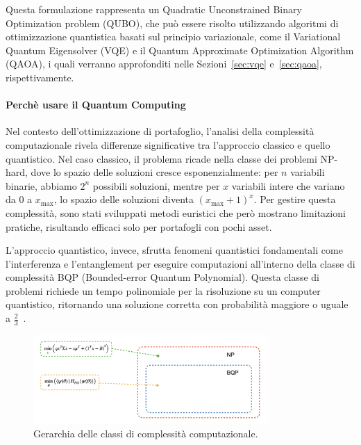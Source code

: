 Questa formulazione rappresenta un Quadratic Unconstrained Binary Optimization 
problem (QUBO), che può essere risolto utilizzando algoritmi di ottimizzazione 
quantistica basati sul principio variazionale, come il Variational Quantum Eigensolver 
(VQE) e il Quantum Approximate Optimization Algorithm (QAOA), i quali verranno
approfonditi nelle Sezioni~\ref{sec:vqe} e~\ref{sec:qaoa}, rispettivamente.


\paragraph{Perchè usare il Quantum Computing}
Nel contesto dell'ottimizzazione di portafoglio, l'analisi della complessità 
computazionale rivela differenze significative tra l'approccio classico e quello 
quantistico. Nel caso classico, il problema ricade nella classe dei problemi NP-hard, 
dove lo spazio delle soluzioni cresce esponenzialmente: per $n$ variabili binarie, 
abbiamo $2^n$ possibili soluzioni, mentre per $x$ variabili intere che variano da 
0 a $x_{\max}$, lo spazio delle soluzioni diventa $(x_{\max}+1)^x$. 
Per gestire questa complessità, sono stati sviluppati metodi euristici che però mostrano 
limitazioni pratiche, risultando efficaci solo per portafogli con pochi asset.

L'approccio quantistico, invece, sfrutta fenomeni quantistici fondamentali 
come l'interferenza e l'entanglement per eseguire computazioni all'interno della 
classe di complessità BQP (Bounded-error Quantum Polynomial). 
Questa classe di problemi richiede un tempo polinomiale per la risoluzione su un 
computer quantistico, ritornando una soluzione corretta con probabilità maggiore 
o uguale a $\frac{2}{3}$~\cite{buonaiuto2023best}.


\begin{figure}[h!]\label{fig:complessita}
    \centering
    \includegraphics[width=0.8\textwidth]{images/complessita.png}
    \caption{Gerarchia delle classi di complessità computazionale.}
\end{figure}